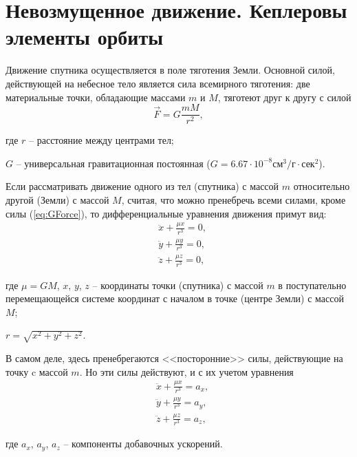 \section{Невозмущенное движение. Кеплеровы элементы орбиты}
\noindent\indent Движение спутника осуществляется в поле тяготения Земли. Основной силой,
действующей на небесное тело является сила всемирного тяготения: две материальные точки,
обладающие массами $m$ и $M$, тяготеют друг к другу с силой
\begin{equation} \label{eq:GForce}
  \vec{F} = G\frac{mM}{r^2},
\end{equation}\par
    где $r$ -- расстояние между центрами тел;\par
    $G$ -- универсальная гравитационная постоянная
($G = 6.67\cdot10^{-8}\text{см}^3/г\cdot\text{сек}^2$).\par
    Если рассматривать движение одного из тел (спутника) с массой $m$ относительно
другой (Земли) с массой $M$, считая, что можно пренебречь всеми силами, кроме силы
(\ref{eq:GForce}), то дифференциальные уравнения движения примут вид:
\begin{equation}
  \begin{aligned}
    &\ddot{x} + \frac{\mu x}{r^3} = 0, \\
    &\ddot{y} + \frac{\mu y}{r^3} = 0, \\
    &\ddot{z} + \frac{\mu z}{r^3} = 0,
  \end{aligned}
\end{equation}\par
    где $\mu = GM$, $x$, $y$, $z$ -- координаты точки (спутника) с массой $m$ в
поступательно перемещающейся системе координат с началом в точке (центре Земли)
с массой $M$;\par
    $r = \sqrt{x^2 + y^2 + z^2}$.\par
В самом деле, здесь пренебрегаются <<посторонние>> силы, действующие на точку c
массой $m$. Но эти силы действуют, и с их учетом уравнения
\begin{equation} \label{eq:GAccelerationModify}
  \begin{aligned}
    &\ddot{x} + \frac{\mu x}{r^3} = a_x, \\
    &\ddot{y} + \frac{\mu y}{r^3} = a_y, \\
    &\ddot{z} + \frac{\mu z}{r^3} = a_z,
  \end{aligned}
\end{equation}\par
    где $a_x$, $a_y$, $a_z$ -- компоненты добавочных ускорений.\par
